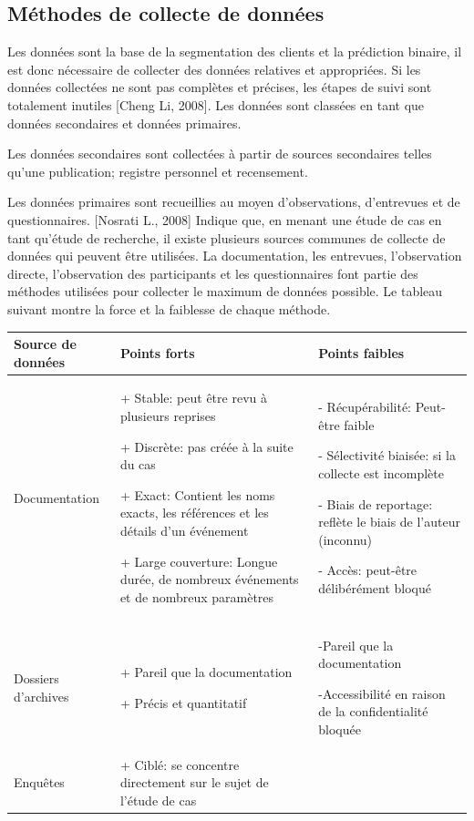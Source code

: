 \documentclass[12pt]{article}
\begin{document}
{\subsection{Méthodes de collecte de données}
Les données sont la base de la segmentation des clients et la prédiction binaire, il est donc nécessaire de collecter des données relatives et appropriées. Si les données collectées ne sont pas complètes et précises, les étapes de suivi sont totalement inutiles {\color{red}[Cheng Li, 2008]}.
Les données sont classées en tant que données secondaires et données primaires.

Les données secondaires sont collectées à partir de sources secondaires telles qu’une publication; registre personnel et recensement. 

Les données primaires sont recueillies au moyen d'observations, d'entrevues et de questionnaires. {\color{red}[Nosrati L., 2008]} Indique que, en menant une étude de cas en tant qu'étude de recherche, il existe plusieurs sources communes de collecte de données qui peuvent être utilisées. La documentation, les entrevues, l'observation directe, l'observation des participants et les questionnaires font partie des méthodes utilisées pour collecter le maximum de données possible. Le tableau suivant montre la force et la faiblesse de chaque méthode.

\begin{center}
\begin{tabular}{|p{3cm}|p{6cm}|p{6cm}|}
\hline
   Source de données & Points forts & Points faibles \\
  \hline
    Documentation &+ Stable: peut être revu à plusieurs reprises
    
+ Discrète: pas créée à la suite du cas

+ Exact: Contient les noms exacts, les références et les détails d'un événement

+ Large couverture: Longue durée, de nombreux événements et de nombreux paramètres
 & - Récupérabilité: Peut-être faible
 
- Sélectivité biaisée: si la collecte est incomplète

- Biais de reportage: reflète le biais de l'auteur (inconnu)

- Accès: peut-être délibérément bloqué
\\
  \hline
   Dossiers d'archives&+ Pareil que la documentation 
   
+ Précis et quantitatif
& -Pareil que la documentation 

-Accessibilité en raison de la confidentialité bloquée
 \\
  \hline
 Enquêtes& + Ciblé: se concentre directement sur le sujet de l'étude de cas
 

\end{tabular}
\end{center}}
\end{document}
